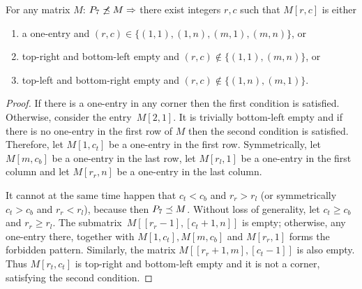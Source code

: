 \begin{lemma}
\label{lemma:p33}
For any matrix $M$: $P_7\not\preceq M\Rightarrow$ there exist integers $r,c$ such that $M[r,c]$ is either
\begin{enumerate}
\item a one-entry and $(r,c)\in\{(1,1),(1,n),(m,1),(m,n)\}$, or
\item top-right and bottom-left empty and $(r,c)\not\in\{(1,1),(m,n)\}$, or
\item top-left and bottom-right empty and $(r,c)\not\in\{(1,n),(m,1)\}$.
\end{enumerate}
\end{lemma}
\begin{proof}
If there is a one-entry in any corner then the first condition is satisfied. Otherwise, consider the entry~$M[2,1]$. It is trivially bottom-left empty and if there is no one-entry in the first row of $M$ then the second condition is satisfied. Therefore, let $M[1,c_t]$ be a one-entry in the first row. Symmetrically, let $M[m,c_b]$ be a one-entry in the last row, let $M[r_l,1]$ be a one-entry in the first column and let $M[r_r,n]$ be a one-entry in the last column.

It cannot at the same time happen that $c_t<c_b$ and $r_r>r_l$ (or symmetrically $c_t>c_b$ and $r_r<r_l$), because then $P_7\preceq M$. Without loss of generality, let $c_t\geq c_b$ and $r_r\geq r_l$. The submatrix~$M[[r_r-1],[c_t+1,n]]$ is empty; otherwise, any one-entry there, together with $M[1,c_t],M[m,c_b]$ and $M[r_r,1]$ forms the forbidden pattern. Similarly, the matrix $M[[r_r+1,m],[c_t-1]]$ is also empty. Thus $M[r_t,c_t]$ is top-right and bottom-left empty and it is not a corner, satisfying the second condition.
\end{proof}

